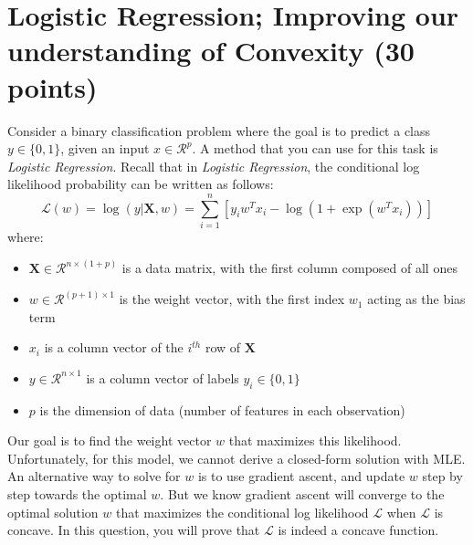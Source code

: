 \documentclass{article}
\begin{document}
\section{Logistic Regression; Improving our understanding of Convexity (30 points)}
Consider a binary classification problem where the goal is to predict a class $y \in \{0,1\}$, given an input $x \in \mathcal{R}^p$. A method that you can use for this task is \textit{Logistic Regression}. Recall that in \textit{Logistic Regression}, the conditional log likelihood probability can be written as follows: 
\begin{equation*}
\mathcal{L}(w) = \log(y|\mathbf{X}, w) = \sum_{i=1}^n[y_i w^T x_i - \log(1+ \exp(w^T x_i))]
\end{equation*}
where:
\begin{itemize}
\item $\mathbf{X} \in \mathcal{R}^{n\times(1+p)}$ is a data matrix, with the first column composed of all ones 
\item $w \in \mathcal{R}^{(p+1) \times 1}$ is the weight vector, with the first index $w_1$ acting as the bias term
\item $x_i$ is a column vector of the $i^{th}$ row of $\mathbf{X}$
\item $y \in \mathcal{R}^{n\times1}$ is a column vector of labels $y_i \in\{0,1\}$
\item $p$ is the dimension of data (number of features in each observation)
\end{itemize}
Our goal is to find the weight vector $w$ that maximizes this likelihood. Unfortunately, for this model, we cannot derive a closed-form solution with MLE. An alternative way to solve for $w$ is to use gradient ascent, and update $w$ step by step towards the optimal $w$. But we know gradient ascent will converge to the optimal solution $w$ that maximizes the conditional log likelihood $\mathcal{L}$ when $\mathcal{L}$ is concave. In this question, you will prove that $\mathcal{L}$ is indeed a concave function.
\end{document}

